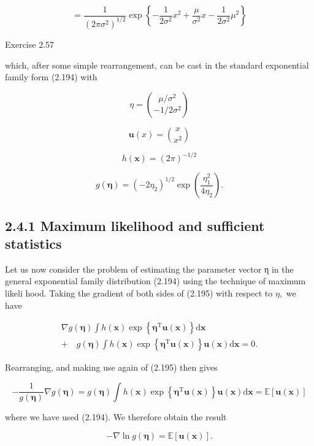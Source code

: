 \documentclass[
  10
]{article}
\begin{document}
\[
= \frac {1}{(2 \pi \sigma^ {2}) ^ {1 / 2}} \exp \left\{- \frac {1}{2 \sigma^ {2}} x ^ {2} + \frac {\mu}{\sigma^ {2}} x - \frac {1}{2 \sigma^ {2}} \mu^ {2} \right\}\tag{2.219}
\]

Exercise 2.57

which, after some simple rearrangement, can be cast in the standard
exponential family form (2.194) with

\[
\eta = \binom{\mu / \sigma^ {2}}{- 1 / 2 \sigma^ {2}}\tag{2.220}
\]

\[
\mathbf {u} (x) = \binom{x}{x ^ {2}}\tag{2.221}
\]

\[
{ h ( \mathbf { x } ) } = { ( 2 \pi ) ^ { - 1 / 2 } }\tag{2.222}
\]

\[
g (\pmb {\eta}) = (- 2 \eta_ {2}) ^ {1 / 2} \exp \left(\frac {\eta_ {1} ^ {2}}{4 \eta_ {2}}\right).\tag{2.223}
\]

\subsection{2.4.1 Maximum likelihood and sufficient
statistics}\label{maximum-likelihood-and-sufficient-statistics}

Let us now consider the problem of estimating the parameter vector η in
the general exponential family distribution (2.194) using the technique
of maximum likeli hood. Taking the gradient of both sides of (2.195)
with respect to \(\eta ,\) we have

\[
\begin{array}{l} \nabla g (\boldsymbol {\eta}) \int h (\mathbf {x}) \exp \left\{\boldsymbol {\eta} ^ {\mathrm{T}} \mathbf {u} (\mathbf {x}) \right\} \mathrm{d} \mathbf {x} \\ + \quad g (\boldsymbol {\eta}) \int h (\mathbf {x}) \exp \left\{\boldsymbol {\eta} ^ {\mathrm{T}} \mathbf {u} (\mathbf {x}) \right\} \mathbf {u} (\mathbf {x}) \mathrm{d} \mathbf {x} = 0. \end{array}\tag{2.224}
\]

Rearranging, and making use again of (2.195) then gives

\[
- \frac {1}{g (\pmb {\eta})} \nabla g (\pmb {\eta}) = g (\pmb {\eta}) \int h (\mathbf {x}) \exp \left\{\pmb {\eta} ^ {\mathrm{T}} \mathbf {u} (\mathbf {x}) \right\} \mathbf {u} (\mathbf {x}) \mathrm{d} \mathbf {x} = \mathbb {E} [ \mathbf {u} (\mathbf {x}) ]\tag{2.225}
\]

where we have used (2.194). We therefore obtain the result

\[
- \nabla \ln g (\boldsymbol {\eta}) = \mathbb {E} [ \mathbf {u} (\mathbf {x}) ].\tag{2.226}
\]
\end{document}
